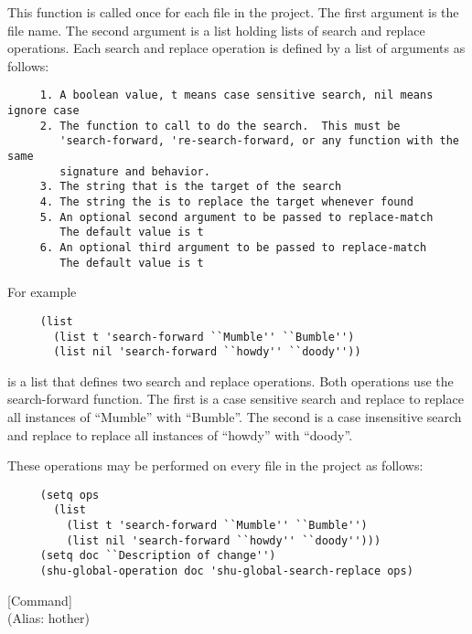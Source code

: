\begin{doc-string}
This function is called once for each file in the project.  The first
argument is the file name.  The second argument is a list holding lists of
search and replace operations.  Each search and replace operation is defined by
a list of arguments as follows:

\small{\begin{verbatim}
     1. A boolean value, t means case sensitive search, nil means ignore case
     2. The function to call to do the search.  This must be
        'search-forward, 're-search-forward, or any function with the same
        signature and behavior.
     3. The string that is the target of the search
     4. The string the is to replace the target whenever found
     5. An optional second argument to be passed to replace-match
        The default value is t
     6. An optional third argument to be passed to replace-match
        The default value is t
\end{verbatim}}

For example

\small{\begin{verbatim}
     (list
       (list t 'search-forward ``Mumble'' ``Bumble'')
       (list nil 'search-forward ``howdy'' ``doody''))
\end{verbatim}}

is a list that defines two search and replace operations.  Both operations use
the search-forward function.  The first is a case sensitive search and replace to
replace all instances of ``Mumble'' with ``Bumble''.  The second is a case
insensitive search and replace to replace all instances of ``howdy'' with ``doody''.

These operations may be performed on every file in the project as follows:

\small{\begin{verbatim}
     (setq ops
       (list
         (list t 'search-forward ``Mumble'' ``Bumble'')
         (list nil 'search-forward ``howdy'' ``doody'')))
     (setq doc ``Description of change'')
     (shu-global-operation doc 'shu-global-search-replace ops)
\end{verbatim}}
\end{doc-string}

\vspace{1em}
\noindent
{}
\usebox{\funcname}
 \hfill [Command]\\%
 (Alias: hother)

